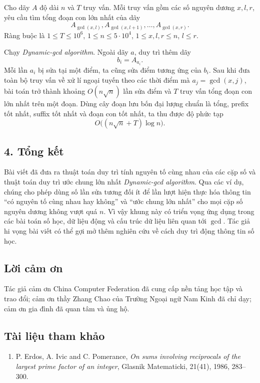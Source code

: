 \documentclass[11pt]{article}
\begin{document}
Cho dãy \(A\) độ dài \(n\) và \(T\) truy vấn. Mỗi truy vấn gồm các số nguyên
dương \(x,l,r\), yêu cầu tìm tổng đoạn con lớn nhất của dãy
\[
  A_{\gcd(x,l)}, A_{\gcd(x,l+1)},\ldots,A_{\gcd(x,r)}.
\]
Ràng buộc là \(1\le T\le 10^6\), \(1\le n\le 5\cdot 10^4\),
\(1\le x,l,r\le n\), \(l\le r\).

Chạy \emph{Dynamic-gcd algorithm}. Ngoài dãy \(a\), duy trì thêm dãy
\[
  b_i=A_{a_i}.
\]
Mỗi lần \(a_i\) bị sửa tại một điểm, ta cũng sửa điểm tương ứng của \(b_i\).
Sau khi đưa toàn bộ truy vấn về xử lí ngoại tuyến theo các thời điểm mà
\(a_j=\gcd(x,j)\), bài toán trở thành khoảng \(O(n\sqrt n)\) lần sửa điểm và
\(T\) truy vấn tổng đoạn con lớn nhất trên một đoạn. Dùng cây đoạn lưu bốn đại
lượng chuẩn là tổng, prefix tốt nhất, suffix tốt nhất và đoạn con tốt nhất, ta
thu được độ phức tạp
\[
  O\bigl((n\sqrt n+T)\log n\bigr).
\]

\subsection*{4. Tổng kết}

Bài viết đã đưa ra thuật toán duy trì tính nguyên tố cùng nhau của các cặp số
và thuật toán duy trì ước chung lớn nhất \emph{Dynamic-gcd algorithm}. Qua các
ví dụ, chúng cho phép dùng số lần sửa tương đối ít để lần lượt hiện thực hóa
thông tin ``có nguyên tố cùng nhau hay không'' và ``ước chung lớn nhất'' cho
mọi cặp số nguyên dương không vượt quá \(n\). Vì vậy khung này có triển vọng
ứng dụng trong các bài toán số học, dữ liệu động và cấu trúc dữ liệu liên quan
tới \(\gcd\). Tác giả hi vọng bài viết có thể gợi mở thêm nghiên cứu về cách
duy trì động thông tin số học.

\subsection*{Lời cảm ơn}

Tác giả cảm ơn China Computer Federation đã cung cấp nền tảng học tập và trao
đổi; cảm ơn thầy Zhang Chao của Trường Ngoại ngữ Nam Kinh đã chỉ dạy; cảm ơn
gia đình đã quan tâm và ủng hộ.

\subsection*{Tài liệu tham khảo}

\begin{enumerate}
\item P. Erdos, A. Ivic and C. Pomerance, \emph{On sums involving reciprocals
of the largest prime factor of an integer}, Glasnik Matematicki, 21(41), 1986,
283--300.
\end{enumerate}
\end{document}
